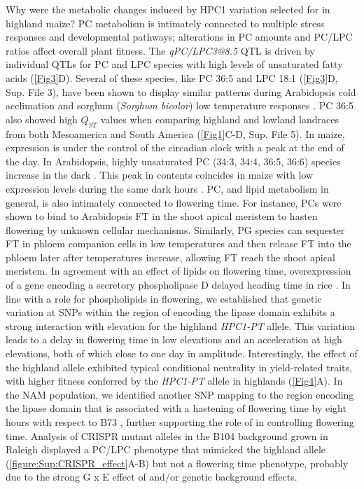 Why were the metabolic changes induced by HPC1 variation selected for in highland maize?
PC metabolism is intimately connected to multiple stress responses and developmental pathways; alterations in PC amounts and PC/LPC ratios affect overall plant fitness.
The \textit{qPC/LPC3@8.5} QTL is driven by individual QTLs for PC and LPC species with high levels of unsaturated fatty acids (\cref{Fig3}D).
Several of these species, like PC 36:5 and LPC 18:1 (\cref{Fig3}D, Sup. File 3), have been shown to display similar patterns during Arabidopsis cold acclimation \citep{Welti2002-uk} and sorghum (\textit{Sorghum bicolor}) low temperature responses \citep{Marla2017-ph}.
PC 36:5 also showed high $Q_{ST}$ values when comparing highland and lowland landraces from both Mesoamerica and South America (\cref{Fig1}C-D, Sup. File 5).
In maize, \hpc expression is under the control of the circadian clock \citep{Khan2010-iv} with a peak at the end of the day. 
In Arabidopsis, highly unsaturated PC (34:3, 34:4, 36:5, 36:6) species increase in the dark \citep{Maatta2012-ip}. 
This peak in contents coincides in maize with low \hpc expression levels during the same dark hours \citep{Khan2010-iv}.
PC, and lipid metabolism in general, is also intimately connected to flowering time. 
For instance, PCs were shown to bind to Arabidopsis FT in the shoot apical meristem to hasten flowering \citep{Nakamura2014-qf, Nakamura2019-ht} by unknown cellular mechanisms. 
Similarly, PG species can sequester FT in phloem companion cells in low temperatures \citep{Susila2021-dz} and then release FT into the phloem later after temperatures increase, allowing FT reach the shoot apical meristem.   
In agreement with an effect of lipids on flowering time, overexpression of a gene encoding a secretory phospholipase D delayed heading time in rice \citep{Qu2021-wc}.
In line with a role for phospholipids in flowering, we established that genetic variation at SNPs within the region of \hpc encoding the lipase domain exhibits a strong interaction with elevation for the highland \textit{HPC1-PT} allele. 
This variation leads to a delay in flowering time in low elevations and an acceleration at high elevations, both of which close to one day in amplitude. 
Interestingly, the effect of the highland \hpc allele exhibited typical conditional neutrality in yield-related traits, with higher fitness conferred by the \textit{HPC1-PT} allele in highlands (\cref{Fig4}A). 
In the NAM population, we identified another SNP mapping to the region encoding the lipase domain that is associated with a hastening of flowering time by eight hours with respect to B73 \citep{Wallace2014-yy}, further supporting the role of \hpc in controlling flowering time. 
Analysis of \hpc CRISPR mutant alleles in the B104 background grown in Raleigh displayed a PC/LPC phenotype that mimicked the highland allele (\cref{figure:Sup:CRISPR_effect}A-B) but not a flowering time phenotype, probably due to the strong G x E effect of \hpc and/or genetic background effects. 

